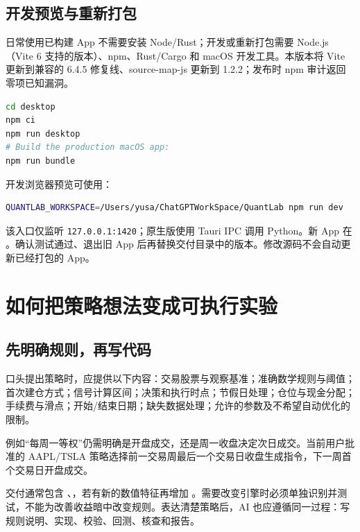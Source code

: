 \documentclass[UTF8,fontset=none,11pt]{ctexart}
\newcommand{\code}[1]{\nolinkurl{#1}}
\newcommand{\chapterpage}{\par}
\let\originalsection\section
\renewcommand{\section}{\Needspace{9\baselineskip}\originalsection}
\let\originalsubsection\subsection
\renewcommand{\subsection}{\Needspace{8\baselineskip}\originalsubsection}
\begin{document}
\subsection{开发预览与重新打包}
日常使用已构建 App 不需要安装 Node/Rust；开发或重新打包需要 Node.js（Vite 6 支持的版本）、npm、Rust/Cargo 和 macOS 开发工具。本版本将 Vite 更新到兼容的 6.4.5 修复线、source-map-js 更新到 1.2.2；发布时 npm 审计返回零项已知漏洞。
\begin{lstlisting}[language=bash]
cd desktop
npm ci
npm run desktop
# Build the production macOS app:
npm run bundle
\end{lstlisting}
开发浏览器预览可使用：
\begin{lstlisting}[language=bash]
QUANTLAB_WORKSPACE=/Users/yusa/ChatGPTWorkSpace/QuantLab npm run dev
\end{lstlisting}
该入口仅监听 \code{127.0.0.1:1420}；原生版使用 Tauri IPC 调用 Python。新 App 在 。确认测试通过、退出旧 App 后再替换交付目录中的版本。修改源码不会自动更新已经打包的 App。

\chapterpage
\section{如何把策略想法变成可执行实验}
\subsection{先明确规则，再写代码}
口头提出策略时，应提供以下内容：交易股票与观察基准；准确数学规则与阈值；首次建仓方式；信号计算区间；决策和执行时点；节假日处理；仓位与现金分配；手续费与滑点；开始/结束日期；缺失数据处理；允许的参数及不希望自动优化的限制。

例如“每周一等权”仍需明确是开盘成交，还是周一收盘决定次日成交。当前用户批准的 AAPL/TSLA 策略选择前一交易周最后一个交易日收盘生成指令，下一周首个交易日开盘成交。

交付通常包含 、，若有新的数值特征再增加 。需要改变引擎时必须单独识别并测试，不能为改善收益暗中改变规则。表达清楚策略后，AI 也应遵循同一过程：写规则说明、实现、校验、回测、核查和报告。
\end{document}
